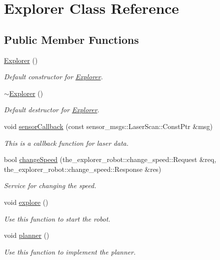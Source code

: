 \hypertarget{classExplorer}{}\section{Explorer Class Reference}
\label{classExplorer}
\subsection*{Public Member Functions}
\begin{DoxyCompactItemize}
\item 
\mbox{\hyperlink{classExplorer_acbedef0262785b6983d1fe9b4f2c6242}{Explorer}} ()
\begin{DoxyCompactList}\small\item\em Default constructor for \mbox{\hyperlink{classExplorer}{Explorer}}. \end{DoxyCompactList}\item 
\mbox{\hyperlink{classExplorer_aa1b0a71e92e003e9162a5ba99d843392}{$\sim$\+Explorer}} ()
\begin{DoxyCompactList}\small\item\em Default destructor for \mbox{\hyperlink{classExplorer}{Explorer}}. \end{DoxyCompactList}\item 
void \mbox{\hyperlink{classExplorer_a99a6215e70f2449189b0a3cb7ec12994}{sensor\+Callback}} (const sensor\+\_\+msgs\+::\+Laser\+Scan\+::\+Const\+Ptr \&msg)
\begin{DoxyCompactList}\small\item\em This is a callback function for laser data. \end{DoxyCompactList}\item 
bool \mbox{\hyperlink{classExplorer_aa860260292752413282de7f9d9ddfbc2}{change\+Speed}} (the\+\_\+explorer\+\_\+robot\+::change\+\_\+speed\+::\+Request \&req, the\+\_\+explorer\+\_\+robot\+::change\+\_\+speed\+::\+Response \&res)
\begin{DoxyCompactList}\small\item\em Service for changing the speed. \end{DoxyCompactList}\item 
void \mbox{\hyperlink{classExplorer_a246ceb49142bbd15bdbdc3b900269294}{explore}} ()
\begin{DoxyCompactList}\small\item\em Use this function to start the robot. \end{DoxyCompactList}\item 
void \mbox{\hyperlink{classExplorer_a14789aaaa077a3b9463b1bc9ff4ca693}{planner}} ()
\begin{DoxyCompactList}\small\item\em Use this function to implement the planner. \end{DoxyCompactList}\end{DoxyCompactItemize}
